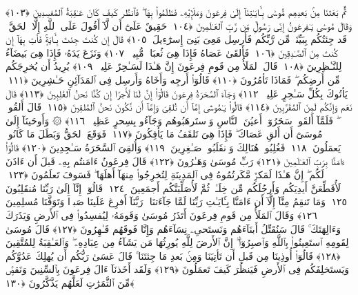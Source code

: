  ثُمَّ بَعَثنَا مِنۢ بَعدِهِم مُّوسَىٰ بِـَٔايَـٰتِنَآ إِلَىٰ فِرعَونَ وَمَلَإِي۟هِۦ فَظَلَمُوا۟ بِهَا ۖ فَٱنظُر كَيفَ كَانَ عَـٰقِبَةُ ٱلمُفسِدِينَ ﴿١٠٣﴾
 وَقَالَ مُوسَىٰ يَـٰفِرعَونُ إِنِّى رَسُولٌۭ مِّن رَّبِّ ٱلعَـٰلَمِينَ ﴿١٠٤﴾
 حَقِيقٌ عَلَىٰٓ أَن لَّآ أَقُولَ عَلَى ٱللَّهِ إِلَّا ٱلحَقَّ ۚ قَد جِئتُكُم بِبَيِّنَةٍۢ مِّن رَّبِّكُم فَأَرسِل مَعِىَ بَنِىٓ إِسرَٰٓءِيلَ ﴿١٠٥﴾
 قَالَ إِن كُنتَ جِئتَ بِـَٔايَةٍۢ فَأتِ بِهَآ إِن كُنتَ مِنَ ٱلصَّـٰدِقِينَ ﴿١٠٦﴾
 فَأَلقَىٰ عَصَاهُ فَإِذَا هِىَ ثُعبَانٌۭ مُّبِينٌۭ ﴿١٠٧﴾
 وَنَزَعَ يَدَهُۥ فَإِذَا هِىَ بَيضَآءُ لِلنَّـٰظِرِينَ ﴿١٠٨﴾
 قَالَ ٱلمَلَأُ مِن قَومِ فِرعَونَ إِنَّ هَـٰذَا لَسَـٰحِرٌ عَلِيمٌۭ ﴿١٠٩﴾
 يُرِيدُ أَن يُخرِجَكُم مِّن أَرضِكُم ۖ فَمَاذَا تَأمُرُونَ ﴿١١٠﴾
 قَالُوٓا۟ أَرجِه وَأَخَاهُ وَأَرسِل فِى ٱلمَدَآئِنِ حَـٰشِرِينَ ﴿١١١﴾
 يَأتُوكَ بِكُلِّ سَـٰحِرٍ عَلِيمٍۢ ﴿١١٢﴾
 وَجَآءَ ٱلسَّحَرَةُ فِرعَونَ قَالُوٓا۟ إِنَّ لَنَا لَأَجرًا إِن كُنَّا نَحنُ ٱلغَٰلِبِينَ ﴿١١٣﴾
 قَالَ نَعَم وَإِنَّكُم لَمِنَ ٱلمُقَرَّبِينَ ﴿١١٤﴾
 قَالُوا۟ يَـٰمُوسَىٰٓ إِمَّآ أَن تُلقِىَ وَإِمَّآ أَن نَّكُونَ نَحنُ ٱلمُلقِينَ ﴿١١٥﴾
 قَالَ أَلقُوا۟ ۖ فَلَمَّآ أَلقَوا۟ سَحَرُوٓا۟ أَعيُنَ ٱلنَّاسِ وَٱستَرهَبُوهُم وَجَآءُو بِسِحرٍ عَظِيمٍۢ ﴿١١٦﴾
 ۞ وَأَوحَينَآ إِلَىٰ مُوسَىٰٓ أَن أَلقِ عَصَاكَ ۖ فَإِذَا هِىَ تَلقَفُ مَا يَأفِكُونَ ﴿١١٧﴾
 فَوَقَعَ ٱلحَقُّ وَبَطَلَ مَا كَانُوا۟ يَعمَلُونَ ﴿١١٨﴾
 فَغُلِبُوا۟ هُنَالِكَ وَٱنقَلَبُوا۟ صَـٰغِرِينَ ﴿١١٩﴾
 وَأُلقِىَ ٱلسَّحَرَةُ سَـٰجِدِينَ ﴿١٢٠﴾
 قَالُوٓا۟ ءَامَنَّا بِرَبِّ ٱلعَـٰلَمِينَ ﴿١٢١﴾
 رَبِّ مُوسَىٰ وَهَـٰرُونَ ﴿١٢٢﴾
 قَالَ فِرعَونُ ءَامَنتُم بِهِۦ قَبلَ أَن ءَاذَنَ لَكُم ۖ إِنَّ هَـٰذَا لَمَكرٌۭ مَّكَرتُمُوهُ فِى ٱلمَدِينَةِ لِتُخرِجُوا۟ مِنهَآ أَهلَهَا ۖ فَسَوفَ تَعلَمُونَ ﴿١٢٣﴾
 لَأُقَطِّعَنَّ أَيدِيَكُم وَأَرجُلَكُم مِّن خِلَـٰفٍۢ ثُمَّ لَأُصَلِّبَنَّكُم أَجمَعِينَ ﴿١٢٤﴾
 قَالُوٓا۟ إِنَّآ إِلَىٰ رَبِّنَا مُنقَلِبُونَ ﴿١٢٥﴾
 وَمَا تَنقِمُ مِنَّآ إِلَّآ أَن ءَامَنَّا بِـَٔايَـٰتِ رَبِّنَا لَمَّا جَآءَتنَا ۚ رَبَّنَآ أَفرِغ عَلَينَا صَبرًۭا وَتَوَفَّنَا مُسلِمِينَ ﴿١٢٦﴾
 وَقَالَ ٱلمَلَأُ مِن قَومِ فِرعَونَ أَتَذَرُ مُوسَىٰ وَقَومَهُۥ لِيُفسِدُوا۟ فِى ٱلأَرضِ وَيَذَرَكَ وَءَالِهَتَكَ ۚ قَالَ سَنُقَتِّلُ أَبنَآءَهُم وَنَستَحىِۦ نِسَآءَهُم وَإِنَّا فَوقَهُم قَـٰهِرُونَ ﴿١٢٧﴾
 قَالَ مُوسَىٰ لِقَومِهِ ٱستَعِينُوا۟ بِٱللَّهِ وَٱصبِرُوٓا۟ ۖ إِنَّ ٱلأَرضَ لِلَّهِ يُورِثُهَا مَن يَشَآءُ مِن عِبَادِهِۦ ۖ وَٱلعَـٰقِبَةُ لِلمُتَّقِينَ ﴿١٢٨﴾
 قَالُوٓا۟ أُوذِينَا مِن قَبلِ أَن تَأتِيَنَا وَمِنۢ بَعدِ مَا جِئتَنَا ۚ قَالَ عَسَىٰ رَبُّكُم أَن يُهلِكَ عَدُوَّكُم وَيَستَخلِفَكُم فِى ٱلأَرضِ فَيَنظُرَ كَيفَ تَعمَلُونَ ﴿١٢٩﴾
 وَلَقَد أَخَذنَآ ءَالَ فِرعَونَ بِٱلسِّنِينَ وَنَقصٍۢ مِّنَ ٱلثَّمَرَٰتِ لَعَلَّهُم يَذَّكَّرُونَ ﴿١٣٠﴾
